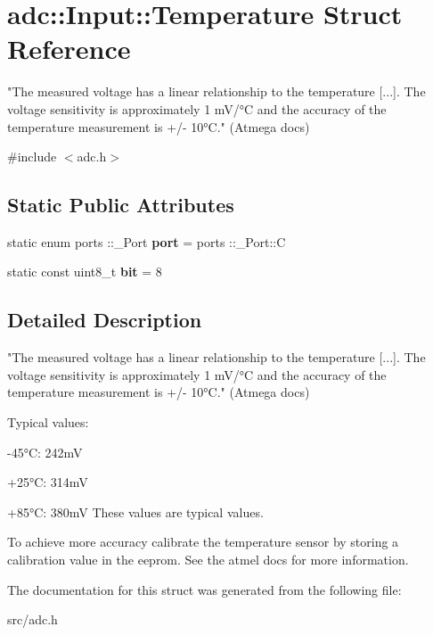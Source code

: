 \hypertarget{structadc_1_1Input_1_1Temperature}{}\section{adc\+:\+:Input\+:\+:Temperature Struct Reference}
\label{structadc_1_1Input_1_1Temperature}


"The measured voltage has a linear relationship to the temperature \mbox{[}...\mbox{]}. The voltage sensitivity is approximately 1 m\+V/°C and the accuracy of the temperature measurement is +/-\/ 10°C." (Atmega docs)  




{\ttfamily \#include $<$adc.\+h$>$}

\subsection*{Static Public Attributes}
\begin{DoxyCompactItemize}
\item 
\hypertarget{structadc_1_1Input_1_1Temperature_ac012a086a736256fccb6c33396289890}{}\label{structadc_1_1Input_1_1Temperature_ac012a086a736256fccb6c33396289890} 
static enum ports \+::\+\_\+\+Port {\bfseries port} = ports \+::\+\_\+\+Port\+::C
\item 
\hypertarget{structadc_1_1Input_1_1Temperature_aebcf8f7325e61063e68ffb71788054b9}{}\label{structadc_1_1Input_1_1Temperature_aebcf8f7325e61063e68ffb71788054b9} 
static const uint8\+\_\+t {\bfseries bit} = 8
\end{DoxyCompactItemize}


\subsection{Detailed Description}
"The measured voltage has a linear relationship to the temperature \mbox{[}...\mbox{]}. The voltage sensitivity is approximately 1 m\+V/°C and the accuracy of the temperature measurement is +/-\/ 10°C." (Atmega docs) 

Typical values\+:
\begin{DoxyItemize}
\item -\/45°C\+: 242mV
\item +25°C\+: 314mV
\item +85°C\+: 380mV These values are typical values.
\end{DoxyItemize}

To achieve more accuracy calibrate the temperature sensor by storing a calibration value in the eeprom. See the atmel docs for more information. 

The documentation for this struct was generated from the following file\+:\begin{DoxyCompactItemize}
\item 
src/adc.\+h\end{DoxyCompactItemize}
